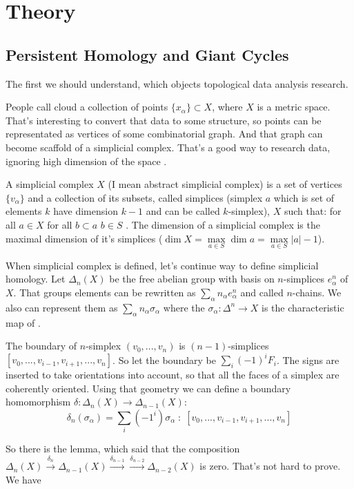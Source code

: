 \documentclass[a4paper, 12pt]{article}
\begin{document}
\section{Theory}
\subsection{Persistent Homology and Giant Cycles}
\par The first we should understand, which objects topological data analysis research.
\par People call cloud a collection of points $\{x_\alpha\} \subset X$, where $X$ is a metric space. That's interesting to convert that data to some structure, so points can be representated as vertices of some combinatorial graph. And that graph can become scaffold of a simplicial complex. That's a good way to research data, ignoring high dimension of the space \cite{ghrist}.
\par A simplicial complex $X$ (I mean abstract simplicial complex) is a set of vertices $\{v_\alpha\}$ and a collection of its subsets, called simplices (simplex $a$ which is set of elements $k$ have dimension $k-1$ and can be called $k$-simplex), $X$ such that: for all $a\in X$ for all $b\subset a$ $b\in S$ \cite{prasolov}. The dimension of a simplicial complex is the maximal dimension of it's simplices ($\dim X = \max\limits_{a\in S} \dim a =\max\limits_{a\in S}|a| - 1$).
\par When simplicial complex is defined, let's continue way to define simplicial homology. Let $\Delta_n(X)$ be the free abelian group with basis on $n$-simplices $e_\alpha^n$ of $X$.  That groups elements can be rewritten as $\sum_\alpha n_\alpha e_\alpha^n$ and called $n$-chains. We also can represent them as $\sum_\alpha n_\alpha \sigma_\alpha$ where the $\sigma_\alpha: \Delta^n\to X$ is the characteristic map of .%
\par The boundary of $n$-simplex $(v_0, ..., v_n)$ is $(n-1)$-simplices $[v_0, ..., v_{i-1}, v_{i+1}, ..., v_n]$. So let the boundary be $\sum_i (-1)^i F_i$. The signs are inserted to take orientations into account, so that all the faces of a simplex are coherently oriented. Using that geometry we can define a boundary homomorphism $\delta: \Delta_n(X) \to \Delta_{n-1}(X)$:
$$
	\delta_n(\sigma_\alpha) = \sum_i (-1^i)\sigma_\alpha \;:\;
	[v_0, ..., v_{i-1}, v_{i+1}, ..., v_n]
$$
\par So there is the lemma, which said that the composition $\Delta_n(X) \xrightarrow{\delta_n} \Delta_{n-1}(X) \xrightarrow{\delta_{n-1}} \xrightarrow{\delta_{n-2}} \Delta_{n-2}(X)$ is zero. That's not hard to prove. We have 
\end{document}
